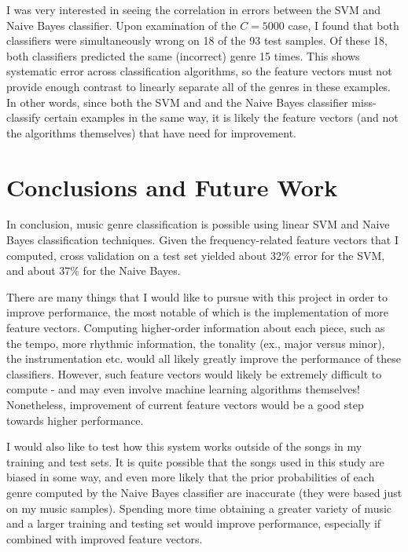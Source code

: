 \documentclass[aps,twocolumn,secnumarabic,balancelastpage,amsmath,amssymb,nofootinbib]{revtex4-1}
\begin{document}
I was very interested in seeing the correlation in errors between the SVM and Naive Bayes classifier. Upon examination of the $C = 5000$ case, I found that both classifiers were simultaneously wrong on 18 of the 93 test samples. Of these 18, both classifiers predicted the same (incorrect) genre 15 times. This shows systematic error across classification algorithms, so the feature vectors must not provide enough contrast to linearly separate all of the genres in these examples. In other words, since both the SVM and and the Naive Bayes classifier miss-classify certain examples in the same way, it is likely the feature vectors (and not the algorithms themselves) that have need for improvement.

\section{Conclusions and Future Work}
In conclusion, music genre classification is possible using linear SVM and Naive Bayes classification techniques. Given the frequency-related feature vectors that I computed, cross validation on a test set yielded about 32\% error for the SVM, and about 37\% for the Naive Bayes.

There are many things that I would like to pursue with this project in order to improve performance, the most notable of which is the implementation of more feature vectors. Computing higher-order information about each piece, such as the tempo, more rhythmic information, the tonality (ex., major versus minor), the instrumentation etc. would all likely greatly improve the performance of these classifiers. However, such feature vectors would likely be extremely difficult to compute - and may even involve machine learning algorithms themselves! Nonetheless, improvement of current feature vectors would be a good step towards higher performance.

I would also like to test how this system works outside of the songs in my training and test sets. It is quite possible that the songs used in this study are biased in some way, and even more likely that the prior probabilities of each genre computed by the Naive Bayes classifier are inaccurate (they were based just on my music samples). Spending more time obtaining a greater variety of music and a larger training and testing set would improve performance, especially if combined with improved feature vectors.
\end{document}
